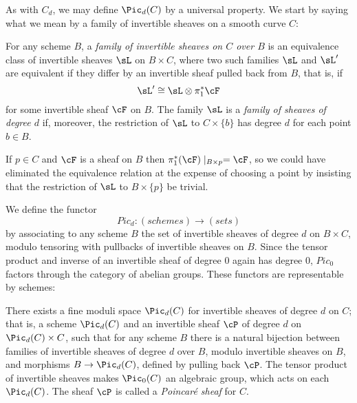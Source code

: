 As with $C_d$, we may define $\Pic_d(C)$ by a universal property. We start by saying what we mean by a family of invertible sheaves on a smooth curve $C$:

\begin{definition}
 For any scheme $B$, a \emph{family of invertible sheaves on $C$ over $B$} is an equivalence class of invertible sheaves $\sL$ on $B\times C$, where two such
 families $\sL$ and $\sL'$ are equivalent if they differ by an invertible sheaf pulled back from $B$, that is, if
 $$
 \sL' \cong \sL \otimes \pi_1^*\cF
 $$
for some invertible sheaf $\cF$ on $B$.
The family $\sL$  is a \emph{family of sheaves of degree $d$} if, moreover, the restriction of $\sL$
 to $C\times \{b\}$ has degree $d$ for each point $b\in B$. 
 \end{definition}

If $p \in C$ and $\cF$ is a sheaf on $B$ then $\pi_1^*(\cF)\mid_{B\times p} = \cF$, so we could have eliminated the
equivalence relation at the expense of choosing a point by insisting that the restriction of $\sL$ to $B \times \{p\}$ be trivial.
 
 

 

We define the functor
 $$
 Pic_d : (schemes) \to (sets)
 $$
 by associating to any scheme $B$ the set of invertible sheaves of degree $d$ on $B \times C$, modulo tensoring with pullbacks of invertible sheaves on $B$. Since the tensor product and inverse of an invertible sheaf of degree 0 again has degree 0, 
 $Pic_0$ factors through the category of abelian groups. These functors are representable by schemes:
  
 \begin{fact}\cite[Theorem 9.4.8]{Kleiman-PicardScheme}
 There exists a fine moduli space $\Pic_d(C)$ for invertible sheaves of degree $d$ on $C$; that is, a scheme $\Pic_d(C)$ and an invertible sheaf $\cP$ of degree $d$ on $\Pic_d(C) \times C$, such that for any scheme $B$ there is a natural bijection between families of invertible sheaves of degree $d$ over $B$, modulo invertible sheaves on $B$, and morphisms $B \to \Pic_d(C)$, defined by pulling back $\cP$. The tensor product of invertible sheaves makes $\Pic_0(C)$ an algebraic group, which acts on each $\Pic_d(C)$. The sheaf $\cP$ is called a \emph{Poincar\'e sheaf} for $C$.
 \end{fact}
 
